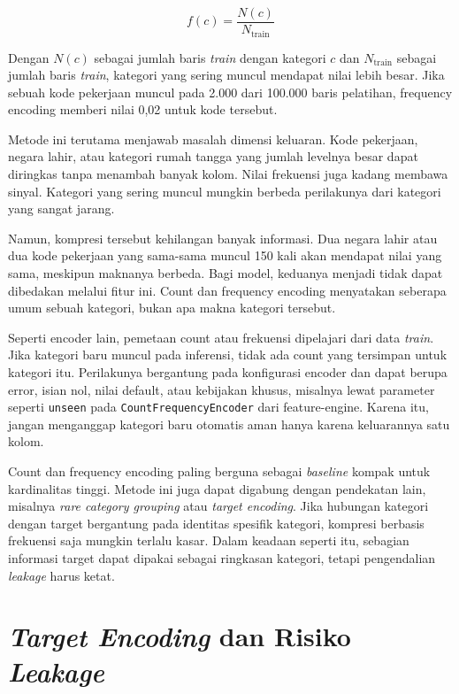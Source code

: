 \[
f(c) = \frac{N(c)}{N_{\text{train}}}
\]

Dengan \(N(c)\) sebagai jumlah baris \emph{train} dengan kategori \(c\) dan \(N_{\text{train}}\) sebagai jumlah baris \emph{train}, kategori yang sering muncul mendapat nilai lebih besar. Jika sebuah kode pekerjaan muncul pada 2.000 dari 100.000 baris pelatihan, frequency encoding memberi nilai 0,02 untuk kode tersebut.

Metode ini terutama menjawab masalah dimensi keluaran. Kode pekerjaan, negara lahir, atau kategori rumah tangga yang jumlah levelnya besar dapat diringkas tanpa menambah banyak kolom. Nilai frekuensi juga kadang membawa sinyal. Kategori yang sering muncul mungkin berbeda perilakunya dari kategori yang sangat jarang.

Namun, kompresi tersebut kehilangan banyak informasi. Dua negara lahir atau dua kode pekerjaan yang sama-sama muncul 150 kali akan mendapat nilai yang sama, meskipun maknanya berbeda. Bagi model, keduanya menjadi tidak dapat dibedakan melalui fitur ini. Count dan frequency encoding menyatakan seberapa umum sebuah kategori, bukan apa makna kategori tersebut.

Seperti encoder lain, pemetaan count atau frekuensi dipelajari dari data \emph{train}. Jika kategori baru muncul pada inferensi, tidak ada count yang tersimpan untuk kategori itu. Perilakunya bergantung pada konfigurasi encoder dan dapat berupa error, isian nol, nilai default, atau kebijakan khusus, misalnya lewat parameter seperti \passthrough{\lstinline!unseen!} pada \passthrough{\lstinline!CountFrequencyEncoder!} dari feature-engine. Karena itu, jangan menganggap kategori baru otomatis aman hanya karena keluarannya satu kolom.

Count dan frequency encoding paling berguna sebagai \emph{baseline} kompak untuk kardinalitas tinggi. Metode ini juga dapat digabung dengan pendekatan lain, misalnya \emph{rare category grouping} atau \emph{target encoding}. Jika hubungan kategori dengan target bergantung pada identitas spesifik kategori, kompresi berbasis frekuensi saja mungkin terlalu kasar. Dalam keadaan seperti itu, sebagian informasi target dapat dipakai sebagai ringkasan kategori, tetapi pengendalian \emph{leakage} harus ketat.

\section{\texorpdfstring{\emph{Target Encoding} dan Risiko \emph{Leakage}}{Target Encoding dan Risiko Leakage}}\label{target-encoding-dan-risiko-leakage}

